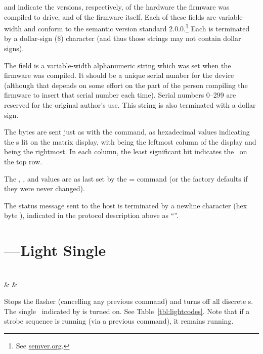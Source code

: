  and  indicate the versions, respectively, of the 
hardware the firmware was compiled to drive, and of the firmware itself. Each of
these fields are variable-width and conform to the semantic version standard 2.0.0.\footnote{See
\href{https://semver.org}{semver.org}.} Each is terminated by a dollar-sign (\z\$) character (and
thus those strings may not contain dollar signs).

The  field is a variable-width alphanumeric string which was set when the firm\-ware was
compiled. It should be a unique serial number for the device (although that depends on
some effort on the part of the person compiling the firmware to insert that serial number
each time). Serial numbers 0--299 are reserved for the original author's use. This string is also
terminated with a dollar sign.

The  bytes are sent just as with the  command, as hexadecimal values indicating
the \led s lit on the matrix display, with  being the leftmost column of the display
and  being the rightmost. In each column, the least significant bit indicates
the \led\ on the top row.

The , , and  values are as last set by the \z= command (or the factory
defaults if they were never changed).

The status message sent to the host is terminated by a newline character (hex byte ),
indicated in the protocol description above as ``''.

\section{---Light Single \led}
\begin{center}
\begin{bytefield}[endianness=little,bitwidth=0.11111\textwidth]{3}
	 \\
	 &
	 &
\end{bytefield}
\end{center}

Stops the flasher (cancelling any previous  command) and turns off all discrete
\led s. The single \led\ indicated by  is turned on. See Table~\ref{tbl:lightcodes}. Note that if a strobe sequence is running (via a previous \z{*} command),
it remains running.

